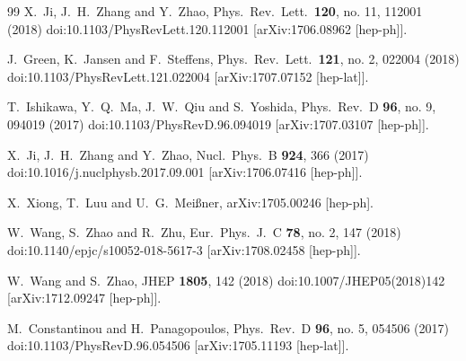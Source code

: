 \documentclass[aps,prd,preprint,tightenlines,superscriptaddress,nofootinbib]{revtex4}
\begin{document}
\begin{thebibliography}{99}
  X.~Ji, J.~H.~Zhang and Y.~Zhao,
  Phys.\ Rev.\ Lett.\  {\bf 120}, no. 11, 112001 (2018)
  doi:10.1103/PhysRevLett.120.112001
  [arXiv:1706.08962 [hep-ph]].

  J.~Green, K.~Jansen and F.~Steffens,
  Phys.\ Rev.\ Lett.\  {\bf 121}, no. 2, 022004 (2018)
  doi:10.1103/PhysRevLett.121.022004
  [arXiv:1707.07152 [hep-lat]].


  T.~Ishikawa, Y.~Q.~Ma, J.~W.~Qiu and S.~Yoshida,
  Phys.\ Rev.\ D {\bf 96}, no. 9, 094019 (2017)
  doi:10.1103/PhysRevD.96.094019
  [arXiv:1707.03107 [hep-ph]].


  X.~Ji, J.~H.~Zhang and Y.~Zhao,
  Nucl.\ Phys.\ B {\bf 924}, 366 (2017)
  doi:10.1016/j.nuclphysb.2017.09.001
  [arXiv:1706.07416 [hep-ph]].

  X.~Xiong, T.~Luu and U.~G.~Meißner,
  arXiv:1705.00246 [hep-ph].

  W.~Wang, S.~Zhao and R.~Zhu,
  Eur.\ Phys.\ J.\ C {\bf 78}, no. 2, 147 (2018)
  doi:10.1140/epjc/s10052-018-5617-3
  [arXiv:1708.02458 [hep-ph]].

  W.~Wang and S.~Zhao,
  JHEP {\bf 1805}, 142 (2018)
  doi:10.1007/JHEP05(2018)142
  [arXiv:1712.09247 [hep-ph]].

  M.~Constantinou and H.~Panagopoulos,
  Phys.\ Rev.\ D {\bf 96}, no. 5, 054506 (2017)
  doi:10.1103/PhysRevD.96.054506
  [arXiv:1705.11193 [hep-lat]].


\end{thebibliography}
\end{document}
